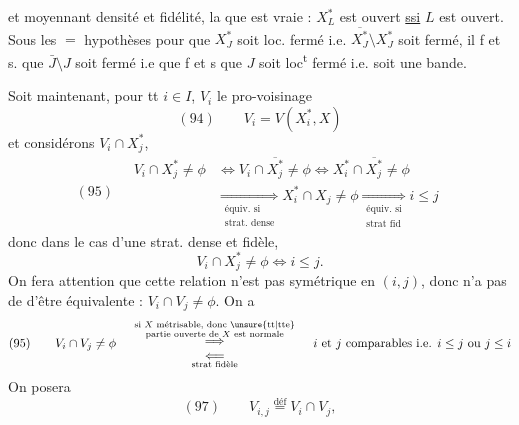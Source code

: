 
et moyennant densité et fidélité, la  que est vraie : $X_L^*$ est ouvert \uline{ssi} $L$ est ouvert. Sous les $=$ hypothèses pour que $X_J^*$ soit loc. fermé i.e. $\overline{X_J^*}\setminus X_J^*$  soit fermé,  il f et s. que $\bar J\setminus J$ soit fermé i.e que f et s que $J$ soit loc\textsuperscript{t} fermé i.e. soit une bande.

Soit maintenant, pour tt $i\in I$, $V_i$ le pro-voisinage
\[(94)\qquad V_i=V(X_i^*,X)\]
et considérons $V_i\cap X_j^*$, 
\[
(95)\quad\begin{aligned}
V_i\cap X_j^*\neq\phi&\Longleftrightarrow V_i\cap\overline{X_j^*}\neq\phi\Longleftrightarrow X_i^*\cap\overline{X_j^*}\neq\phi\\
&\underset{\substack{\text{équiv. si}\\\text{strat. dense}}}{\Longrightarrow}X_i^*\cap X_j\neq\phi\underset{\substack{\text{équiv. si}\\\text{strat fid}}}{\Longrightarrow}i\leq j
\end{aligned}
\]
donc dans le cas d'une strat. dense et fidèle,  
\[V_i\cap X_j^*\neq\phi\Longleftrightarrow i\leq j.\]
On fera attention que cette relation n'est pas symétrique en $(i,j)$,  donc n'a pas de  d'être équivalente : $V_i\cap V_j\neq\phi$. On a
\[
(95)\qquad V_i\cap V_j\neq\phi\quad
\begin{array}{c}
\overset{\substack{\text{si $X$ métrisable, donc \unsure{tt|tte}}\\\text{partie ouverte de $X$ est normale}}}{\Longrightarrow}\\
\underset{\text{strat fidèle}}{\Longleftarrow}
\end{array}
\quad\text{$i$ et $j$ comparables i.e. $i\leq j$ ou $j\leq i$}
\]
On posera
\[(97)\qquad V_{i,j}\overset{\mathrm{déf}}=V_i\cap V_j,\]


